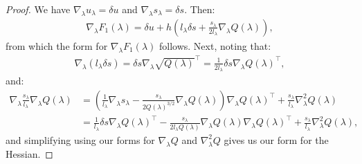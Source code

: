 \documentclass{article}
\newcommand{\parens}[1]{\left(#1\right)}
\begin{document}
\begin{proof}
  We have $\nabla_\lambda u_\lambda = \delta u$ and
  $\nabla_\lambda s_\lambda = \delta s$. Then:
  \begin{align*}
    \nabla_\lambda F_1(\lambda) = \delta u + h \parens{l_\lambda \delta s + \frac{s_\lambda}{2 l_\lambda} \nabla_\lambda Q(\lambda)},
  \end{align*}
  from which the form for $\nabla_\lambda F_1(\lambda)$ follows. Next,
  noting that:
  \begin{align*}
    \nabla_\lambda (l_\lambda \delta s) = \delta s \nabla_\lambda \sqrt{Q(\lambda)}^\top = \frac{1}{2l_\lambda} \delta s \nabla_\lambda Q(\lambda)^\top,
  \end{align*}
  and:
  \begin{align*}
    \nabla_\lambda \frac{s_\lambda}{l_\lambda} \nabla_\lambda Q(\lambda)
    &= \parens{\frac{1}{l_\lambda} \nabla_\lambda s_\lambda - \frac{s_\lambda}{2 Q(\lambda)^{3/2}} \nabla_\lambda Q(\lambda)} \nabla_\lambda Q(\lambda)^\top + \frac{s_\lambda}{l_\lambda} \nabla^2_\lambda Q(\lambda) \\
    &= \frac{1}{l_\lambda} \delta s \nabla_\lambda Q(\lambda)^\top - \frac{s_\lambda}{2 l_\lambda Q(\lambda)} \nabla_\lambda Q(\lambda) \nabla_\lambda Q(\lambda)^\top + \frac{s_\lambda}{l_\lambda} \nabla_\lambda^2 Q(\lambda),
  \end{align*}
  and simplifying using our forms for $\nabla_\lambda Q$ and
  $\nabla_\lambda^2 Q$ gives us our form for the Hessian.
\end{proof}
\end{document}
